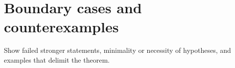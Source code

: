 \section{Boundary cases and counterexamples}
Show failed stronger statements, minimality or necessity of hypotheses, and examples that delimit the theorem.
